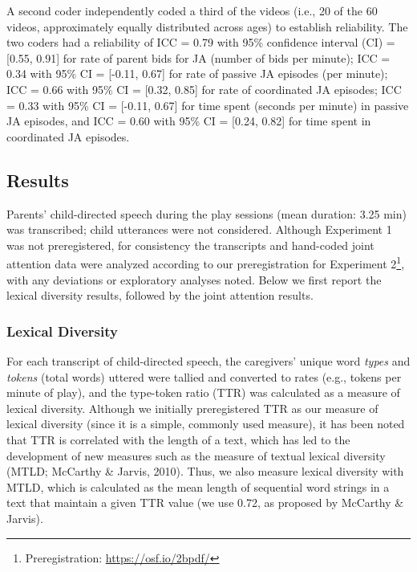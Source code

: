 \documentclass[man,floatsintext]{apa6}
\begin{document}
A second coder independently coded a third of the videos (i.e., 20 of the 60 videos, approximately equally distributed across ages) to establish reliability.
The two coders had a reliability of ICC = 0.79 with 95\% confidence interval (CI) = {[}0.55, 0.91{]} for rate of parent bids for JA (number of bids per minute); ICC = 0.34 with 95\% CI = {[}-0.11, 0.67{]} for rate of passive JA episodes (per minute); ICC = 0.66 with 95\% CI = {[}0.32, 0.85{]} for rate of coordinated JA episodes; ICC = 0.33 with 95\% CI = {[}-0.11, 0.67{]} for time spent (seconds per minute) in passive JA episodes, and ICC = 0.60 with 95\% CI = {[}0.24, 0.82{]} for time spent in coordinated JA episodes.

\hypertarget{results}{%
\subsection{Results}\label{results}}

Parents' child-directed speech during the play sessions (mean duration: 3.25 min) was transcribed; child utterances were not considered.
Although Experiment 1 was not preregistered, for consistency the transcripts and hand-coded joint attention data were analyzed according to our preregistration for Experiment 2\footnote{Preregistration: \href{https://osf.io/2bpdf}{https://osf.io/2bpdf/}}, with any deviations or exploratory analyses noted.
Below we first report the lexical diversity results, followed by the joint attention results.

\hypertarget{lexical-diversity}{%
\subsubsection{Lexical Diversity}\label{lexical-diversity}}

For each transcript of child-directed speech, the caregivers' unique word \emph{types} and \emph{tokens} (total words) uttered were tallied and converted to rates (e.g., tokens per minute of play), and the type-token ratio (TTR) was calculated as a measure of lexical diversity.
Although we initially preregistered TTR as our measure of lexical diversity (since it is a simple, commonly used measure), it has been noted that TTR is correlated with the length of a text, which has led to the development of new measures such as the measure of textual lexical diversity (MTLD; McCarthy \& Jarvis, 2010).
Thus, we also measure lexical diversity with MTLD, which is calculated as the mean length of sequential word strings in a text that maintain a given TTR value (we use 0.72, as proposed by McCarthy \& Jarvis).
\end{document}
